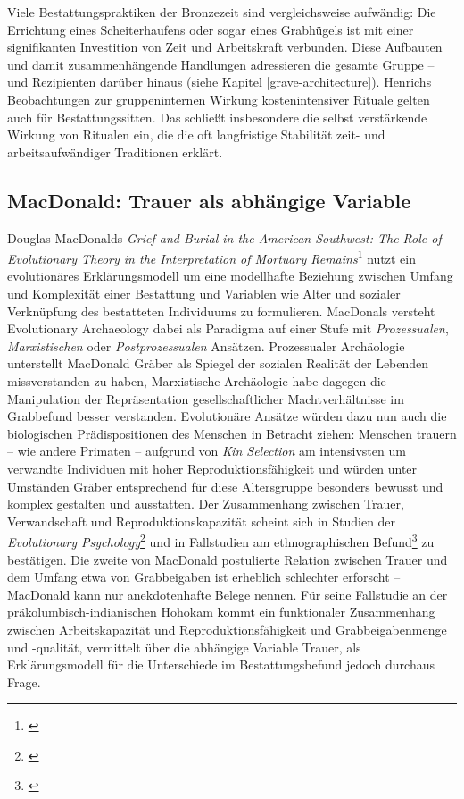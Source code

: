 \documentclass[openany,twoside,twocolumn]{book}
\let\rmarkdownfootnote\footnote%
\def\footnote{\protect\rmarkdownfootnote}
\begin{document}
Viele Bestattungspraktiken der Bronzezeit sind vergleichsweise
aufwändig: Die Errichtung eines Scheiterhaufens oder sogar eines
Grabhügels ist mit einer signifikanten Investition von Zeit und
Arbeitskraft verbunden. Diese Aufbauten und damit zusammenhängende
Handlungen adressieren die gesamte Gruppe -- und Rezipienten darüber
hinaus (siehe Kapitel \ref{grave-architecture}). Henrichs Beobachtungen
zur gruppeninternen Wirkung kostenintensiver Rituale gelten auch für
Bestattungssitten. Das schließt insbesondere die selbst verstärkende
Wirkung von Ritualen ein, die die oft langfristige Stabilität zeit- und
arbeitsaufwändiger Traditionen erklärt.

\hypertarget{macdonald-trauer-als-abhangige-variable}{%
\subsection{MacDonald: Trauer als abhängige
Variable}\label{macdonald-trauer-als-abhangige-variable}}

Douglas MacDonalds \emph{Grief and Burial in the American Southwest: The
Role of Evolutionary Theory in the Interpretation of Mortuary
Remains}\footnote{\textcite{macdonald_grief_2001}} nutzt ein
evolutionäres Erklärungsmodell um eine modellhafte Beziehung zwischen
Umfang und Komplexität einer Bestattung und Variablen wie Alter und
sozialer Verknüpfung des bestatteten Individuums zu formulieren.
MacDonals versteht Evolutionary Archaeology dabei als Paradigma auf
einer Stufe mit \emph{Prozessualen}, \emph{Marxistischen} oder
\emph{Postprozessualen} Ansätzen. Prozessualer Archäologie unterstellt
MacDonald Gräber als Spiegel der sozialen Realität der Lebenden
missverstanden zu haben, Marxistische Archäologie habe dagegen die
Manipulation der Repräsentation gesellschaftlicher Machtverhältnisse im
Grabbefund besser verstanden. Evolutionäre Ansätze würden dazu nun auch
die biologischen Prädispositionen des Menschen in Betracht ziehen:
Menschen trauern -- wie andere Primaten -- aufgrund von \emph{Kin
Selection} am intensivsten um verwandte Individuen mit hoher
Reproduktionsfähigkeit und würden unter Umständen Gräber entsprechend
für diese Altersgruppe besonders bewusst und komplex gestalten und
ausstatten. Der Zusammenhang zwischen Trauer, Verwandschaft und
Reproduktionskapazität scheint sich in Studien der \emph{Evolutionary
Psychology}\footnote{\textcite{segal_grief_1993}} und in Fallstudien am
ethnographischen Befund\footnote{\textcite{crawford_human_1989}} zu
bestätigen. Die zweite von MacDonald postulierte Relation zwischen
Trauer und dem Umfang etwa von Grabbeigaben ist erheblich schlechter
erforscht -- MacDonald kann nur anekdotenhafte Belege nennen. Für seine
Fallstudie an der präkolumbisch-indianischen Hohokam kommt ein
funktionaler Zusammenhang zwischen Arbeitskapazität und
Reproduktionsfähigkeit und Grabbeigabenmenge und -qualität, vermittelt
über die abhängige Variable Trauer, als Erklärungsmodell für die
Unterschiede im Bestattungsbefund jedoch durchaus Frage.
\end{document}
